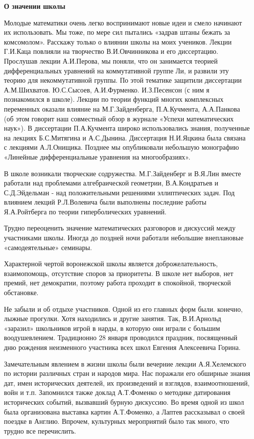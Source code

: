 {\bf О значении школы}

Молодые математики очень легко воспринимают новые идеи и смело начинают их использовать. Мы тоже, по мере сил пытались «задрав штаны бежать за комсомолом». Расскажу только о влиянии школы на моих учеников. Лекции Г.И.Каца повлияли на творчество В.И.Овчинникова и его диссертацию. Прослушав лекции А.И.Перова, мы поняли, что он занимается теорией дифференциальных уравнений на коммутативной группе Ли, и развили эту теорию для некоммутативной группы. По этой тематике защитили диссертации А.М.Шихватов. Ю.С.Сысоев, А.И.Фурменко. И.З.Песенсон (с ним я познакомился в школе). Лекции по теории функций многих комплексных переменных оказали влияние на М.Г.Зайденберга, П.А.Кучмента, А.А.Панкова (об этом говорит наш совместный обзор в журнале «Успехи математических наук»). В диссертации П.А.Кучмента широко использовались знания, полученные на лекциях Б.С.Митягина и А.С.Дынина. Диссертация Н.И.Яцкина была связана с лекциями А.Л.Онищика. Позднее мы опубликовали небольшую монографию «Линейные дифференциальные уравнения на многообразиях».

В школе возникали творческие содружества. М.Г.Зайденберг и В.Я.Лин вместе работали над проблемами алгебраической геометрии, В.А.Кондратьев и С.Д.Эйдельман - над положительными решениями эллиптических задач. Под влиянием лекций Р.Л.Волевича были выполнены последние работы Я.А.Ройтберга по теории гиперболических уравнений.

Трудно переоценить значение математических разговоров и дискуссий между участниками школы. Иногда до поздней ночи работали небольшие внеплановые «самодеятельные» семинары.

Характерной чертой воронежской школы является доброжелательность, взаимопомощь, отсутствие споров за приоритеты. В школе нет выборов, нет премий, нет демократии, поэтому работа проходит в спокойной, творческой обстановке.

Не забыли и об отдыхе участников. Одной из его главных форм были. конечно, лыжные прогулки. Хотя находились и другие занятия. Так, В.И.Арнольд «заразил» школьников игрой в нарды, в которую они играли с большим воодушевлением. Традиционно 28 января проводился праздник, посвященный дню рождения неизменного участника всех школ Евгения Алексеевича Горина.

Замечательным явлением в жизни школы были вечерние лекции А.Я.Хелемского по истории различных стран и народов мира. Нас поражали его обширные знания дат, имен исторических деятелей, их произведений и взглядов,
взаимоотношений, войн и т.п. Запомнился также доклад А.Т.Фоменко о методике датирования исторических событий, вызвавший бурную дискуссию. Во время одной из школ была организована выставка картин А.Т.Фоменко, а Лаптев рассказывал о своей поездке в Англию. Впрочем, культурных мероприятий было так много, что трудно все перечислить.

